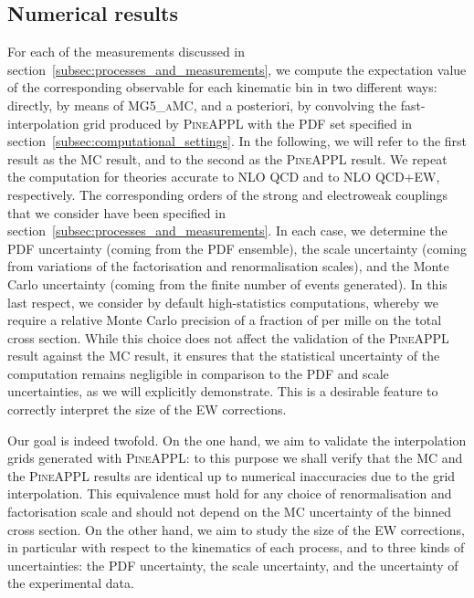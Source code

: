 \subsection{Numerical results}
\label{subsec:numerical_results}

For each of the measurements discussed in
section~\ref{subsec:processes_and_measurements}, we compute the expectation
value of the corresponding observable for each kinematic bin in two different
ways: directly, by means of \textsc{MG5\_aMC}, and a posteriori, by convolving
the fast-interpolation grid produced by \textsc{PineAPPL} with the PDF set
specified in section~\ref{subsec:computational_settings}. In the following, we
will refer to the first result as the MC result, and to the second as
the \textsc{PineAPPL} result. We repeat the computation for theories accurate
to NLO QCD and to NLO QCD+EW, respectively. The corresponding orders of the
strong and electroweak couplings that we consider have been specified in
section~\ref{subsec:processes_and_measurements}. In each case, we determine the
PDF uncertainty (coming from the PDF ensemble), the scale uncertainty (coming
from variations of the factorisation and renormalisation scales), and the Monte
Carlo uncertainty (coming from the finite number of events generated). In this
last respect, we consider by default high-statistics computations, whereby we
require a relative Monte Carlo precision of a fraction of per mille on the total cross section. While
this choice does not affect the validation of the \textsc{PineAPPL} result
against the MC result, it ensures that the statistical uncertainty of
the computation remains negligible in comparison to the PDF and scale
uncertainties, as we will explicitly demonstrate. This is a desirable feature
to correctly interpret the size of the EW corrections.

Our goal is indeed twofold. On the one hand, we aim to validate the
interpolation grids generated with \textsc{PineAPPL}: to this purpose we shall
verify that the MC and the \textsc{PineAPPL} results are identical up to
numerical inaccuracies due to the grid interpolation. This equivalence must
hold for any choice of renormalisation and factorisation scale and should not
depend on the MC uncertainty of the binned cross section. On the other
hand, we aim to study the size of the EW corrections, in particular with
respect to the kinematics of each process, and to three kinds of uncertainties:
the PDF uncertainty, the scale uncertainty, and the uncertainty of the
experimental data.

